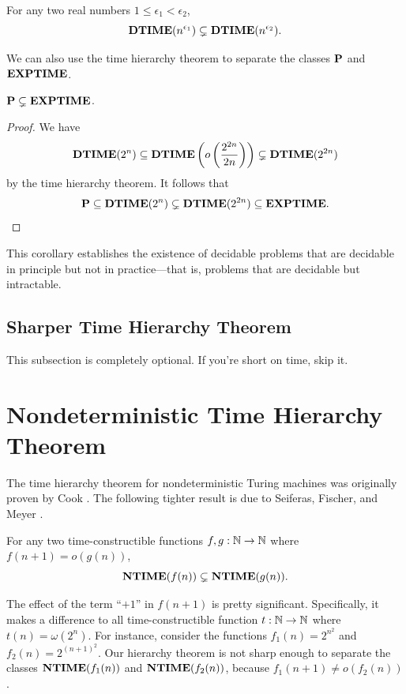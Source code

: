 \documentclass[11pt,twoside=off,numbers=noenddot]{scrbook}
\begin{document}
\begin{corollary}
  For any two real numbers $1 \leq \epsilon_1 < \epsilon_2$,
  \[ \textbf{DTIME}(n^{\epsilon_1}) \subsetneq \textbf{DTIME}(n^{\epsilon_2}). \]
\end{corollary}

We can also use the time hierarchy theorem to separate the classes $\textbf{P}$ and $\textbf{EXPTIME}$.

\begin{corollary}
  $\textbf{P} \subsetneq \textbf{EXPTIME}$.
\end{corollary}

\begin{proof}
  We have
  \[ \textbf{DTIME}(2^n) \subseteq \textbf{DTIME}\left(o\left(\frac{2^{2n}}{2n}\right)\right) \subsetneq \textbf{DTIME}(2^{2n}) \]
  by the time hierarchy theorem. It follows that
  \[ \textbf{P} \subseteq \textbf{DTIME}(2^n) \subsetneq \textbf{DTIME}(2^{2n}) \subseteq \textbf{EXPTIME}. \]
\end{proof}

This corollary establishes the existence of decidable problems that are decidable in principle but not in practice—that is, problems that are decidable but intractable.

\subsection{Sharper Time Hierarchy Theorem}

This subsection is completely optional. If you're short on time, skip it.

\section{Nondeterministic Time Hierarchy Theorem}
The time hierarchy theorem for nondeterministic Turing machines was originally proven by Cook \cite{cook1972hierarchy}. The following tighter result is due to Seiferas, Fischer, and Meyer \cite{seiferas1978separating}.

\begin{theorem}
  For any two time-constructible functions $f, g : \mathbb N \to \mathbb N$ where $f(n + 1) = o(g(n))$,
  \[ \textbf{NTIME}(f(n)) \subsetneq \textbf{NTIME}(g(n)). \]
\end{theorem}

\begin{remark}
  The effect of the term ``$+ 1$'' in $f(n + 1)$ is pretty significant. Specifically, it makes a difference to all time-constructible function $t : \mathbb N \to \mathbb N$ where $t(n) = \omega(2^n)$. For instance, consider the functions $f_1(n) = 2^{n^2}$ and $f_2(n) = 2^{(n + 1)^2}$. Our hierarchy theorem is not sharp enough to separate the classes $\textbf{NTIME}(f_1(n))$ and $\textbf{NTIME}(f_2(n))$, because $f_1(n + 1) \neq o(f_2(n))$.
\end{remark}
\end{document}

